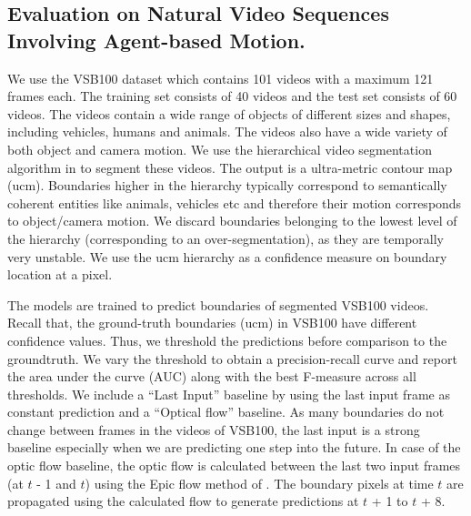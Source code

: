\subsection{Evaluation on Natural Video Sequences Involving Agent-based Motion.}
We use the VSB100 dataset which contains 101 videos with a maximum 121 frames each.  The training set consists of 40 videos and the test set consists of 60 videos. The videos contain a wide range of objects of different sizes and shapes, including vehicles, humans and animals. The videos also have a wide variety of both object and camera motion. We use the hierarchical video segmentation algorithm in \cite{khoreva2016improved} to segment these videos. The output is a ultra-metric contour map (ucm). Boundaries higher in the hierarchy typically correspond to semantically coherent entities like animals, vehicles etc and therefore their motion corresponds to object/camera motion.  We discard boundaries belonging to the lowest level of the hierarchy (corresponding to an over-segmentation), as they are temporally very unstable. We use the ucm hierarchy as a confidence measure on boundary location at a pixel.

 \label{par:mb}
The models are trained to predict boundaries of segmented VSB100 videos. Recall that, the ground-truth boundaries (ucm) in VSB100 have different confidence values. Thus, we threshold the predictions before comparison to the groundtruth. We vary the threshold to obtain a precision-recall curve and report the area under the curve (AUC) along with the best F-measure across all thresholds. We include a ``Last Input'' baseline by using the last input frame as constant prediction and a ``Optical flow'' baseline. As many boundaries do not change between frames in the videos of VSB100, the last input is a strong baseline especially when we are predicting one step into the future. In case of the optic flow baseline, the optic flow is calculated between the last two input frames (at $t$ - 1 and $t$) using the Epic flow method of \cite{revaud2015epicflow}. The boundary pixels at time $t$ are propagated using the calculated flow to generate predictions at $t$ + 1 to $t$ + 8.

